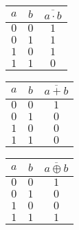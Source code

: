 \begin{Row}
	\begin{Cell}{1}
		\centering
		\begin{tabular}{cc|c}
			\toprule
			$a$ & $b$ & $\overline{a\cdot b}$ \\
			\midrule
			$0$ & $0$ & $1$                   \\
			$0$ & $1$ & $1$                   \\
			$1$ & $0$ & $1$                   \\
			$1$ & $1$ & $0$                   \\
			\bottomrule
		\end{tabular}
	\end{Cell}
	\begin{Cell}{1}
		\centering
		\begin{tabular}{cc|c}
			\toprule
			$a$ & $b$ & $\overline{a+b}$ \\
			\midrule
			$0$ & $0$ & $1$              \\
			$0$ & $1$ & $0$              \\
			$1$ & $0$ & $0$              \\
			$1$ & $1$ & $0$              \\
			\bottomrule
		\end{tabular}
	\end{Cell}
	\begin{Cell}{1}
		\centering
		\begin{tabular}{cc|c}
			\toprule
			$a$ & $b$ & $\overline{a \oplus b}$ \\
			\midrule
			$0$ & $0$ & $1$                     \\
			$0$ & $1$ & $0$                     \\
			$1$ & $0$ & $0$                     \\
			$1$ & $1$ & $1$                     \\
			\bottomrule
		\end{tabular}
	\end{Cell}
	\begin{Cell}{1}
		\phantom{x}
	\end{Cell}
\end{Row}
